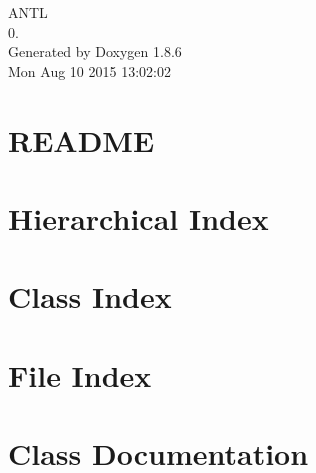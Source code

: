 \documentclass[twoside]{book}
\newcommand{\clearemptydoublepage}{%
  \newpage{\pagestyle{empty}\cleardoublepage}%
}
\begin{document}
\hypersetup{pageanchor=false}
\begin{titlepage}
\vspace*{7cm}
\begin{center}%
{\Large A\-N\-T\-L \\[1ex]\large 0. }\\
\vspace*{1cm}
{\large Generated by Doxygen 1.8.6}\\
\vspace*{0.5cm}
{\small Mon Aug 10 2015 13:02:02}\\
\end{center}
\end{titlepage}
\clearemptydoublepage
\tableofcontents
\clearemptydoublepage
{}
\hypersetup{pageanchor=true}

\chapter{R\-E\-A\-D\-M\-E}
\label{d0/d30/md_README}
\hypertarget{d0/d30/md_README}{}

\chapter{Hierarchical Index}

\chapter{Class Index}

\chapter{File Index}

\chapter{Class Documentation}











\end{document}
